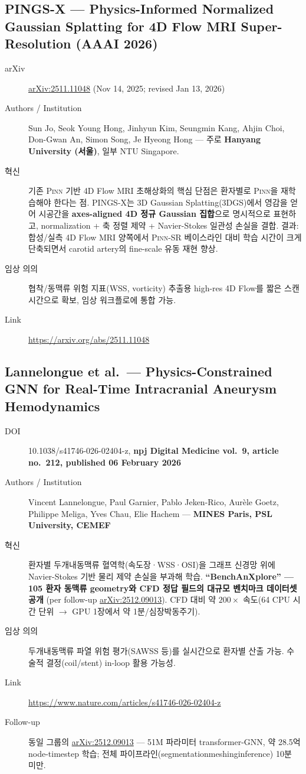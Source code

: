 \documentclass[11pt,a4paper,oneside]{report}
\newcommand{\pinn}{\textsc{Pinn}}
\newcommand{\arxivid}[1]{\href{https://arxiv.org/abs/#1}{arXiv:#1}}
\begin{document}
\subsection{PINGS-X --- Physics-Informed Normalized Gaussian Splatting for 4D Flow MRI Super-Resolution (AAAI 2026)}

\begin{description}
\item[arXiv] \arxivid{2511.11048} (Nov 14, 2025; revised Jan 13, 2026)
\item[Authors / Institution] Sun Jo, Seok Young Hong, Jinhyun Kim, Seungmin Kang, Ahjin Choi, Don-Gwan An, Simon Song, Je Hyeong Hong --- 주로 \textbf{Hanyang University (서울)}, 일부 NTU Singapore.
\item[혁신] 기존 \pinn{} 기반 4D Flow MRI 초해상화의 핵심 단점은 환자별로 \pinn{}을 재학습해야 한다는 점. PINGS-X는 3D Gaussian Splatting(3DGS)에서 영감을 얻어 시공간을 \textbf{axes-aligned 4D 정규 Gaussian 집합}으로 명시적으로 표현하고, normalization + 축 정렬 제약 + Navier-Stokes 일관성 손실을 결합. 결과: 합성/실측 4D Flow MRI 양쪽에서 \pinn{}-SR 베이스라인 대비 학습 시간이 크게 단축되면서 carotid artery의 fine-scale 유동 재현 향상.
\item[임상 의의] 협착/동맥류 위험 지표(WSS, vorticity) 추출용 high-res 4D Flow를 짧은 스캔 시간으로 확보, 임상 워크플로에 통합 가능.
\item[Link] \url{https://arxiv.org/abs/2511.11048}
\end{description}

\subsection{Lannelongue et al.\ --- Physics-Constrained GNN for Real-Time Intracranial Aneurysm Hemodynamics}

\begin{description}
\item[DOI] 10.1038/s41746-026-02404-z, \textbf{npj Digital Medicine vol.\ 9, article no.\ 212, published 06 February 2026}
\item[Authors / Institution] Vincent Lannelongue, Paul Garnier, Pablo Jeken-Rico, Aurèle Goetz, Philippe Meliga, Yves Chau, Elie Hachem --- \textbf{MINES Paris, PSL University, CEMEF}
\item[혁신] 환자별 두개내동맥류 혈역학(속도장·WSS·OSI)을 그래프 신경망 위에 Navier-Stokes 기반 물리 제약 손실을 부과해 학습. \textbf{``BenchAnXplore'' --- 105 환자 동맥류 geometry와 CFD 정답 필드의 대규모 벤치마크 데이터셋 공개} (per follow-up \arxivid{2512.09013}). CFD 대비 약 $200\times$ 속도(64 CPU 시간 단위 $\rightarrow$ GPU 1장에서 약 1분/심장박동주기).
\item[임상 의의] 두개내동맥류 파열 위험 평가(SAWSS 등)를 실시간으로 환자별 산출 가능. 수술적 결정(coil/stent) in-loop 활용 가능성.
\item[Link] \url{https://www.nature.com/articles/s41746-026-02404-z}
\item[Follow-up] 동일 그룹의 \arxivid{2512.09013} --- 51M 파라미터 transformer-GNN, 약 28.5억 node-timestep 학습; 전체 파이프라인(segmentation\textrightarrow{}meshing\textrightarrow{}inference) 10분 미만.
\end{description}
\end{document}
